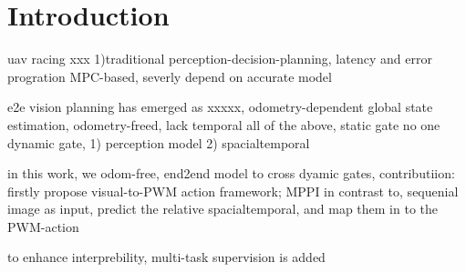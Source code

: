 \section{Introduction}
\label{sec:introduction}
uav racing xxx
1)traditional perception-decision-planning, latency and error progration
MPC-based, severly depend on accurate model

e2e vision planning   has emerged as xxxxx,   odometry-dependent  global state estimation, 
odometry-freed, lack temporal
all of the above, static gate
no one dynamic gate, 
1) perception model
2) spacialtemporal


 

in this work, we odom-free, end2end model to cross dyamic gates, contributiion:
firstly propose visual-to-PWM  action framework;
MPPI 
in contrast to,  sequenial image  as input,  predict the relative spacialtemporal, and map them in to the PWM-action

to enhance interprebility, multi-task supervision is added






